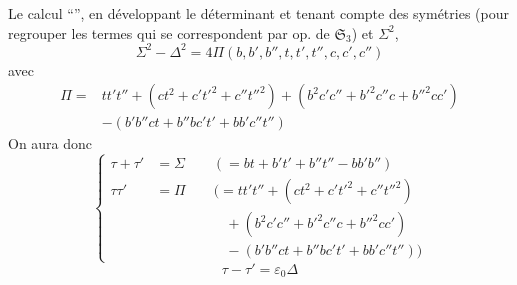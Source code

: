 Le calcul ``'', en développant le déterminant et tenant compte des symétries (pour regrouper les termes qui se correspondent par  op. de $\mathfrak{S}_3$) et $\Sigma^2$,
\[
\Sigma^2-\Delta^2=4\Pi(b,b',b'',t,t',t'',c,c',c'')
\]
avec
\[
\boxed{\begin{aligned}
\Pi={}&tt't''+(ct^2+c't'^2+c''t''^2)+(b^2c'c''+b'^2c''c+b''^2cc')\\
&-(b'b''ct+b''bc't'+bb'c''t'')
\end{aligned}}
\]
\inserted{\[
=tt't''+ct(t-b'b'')+c't'(t'-b''b)+c''t''(t''-bb')+(b^2c'c''+b'^2c''c+b''^2cc')
\]}
On aura donc
\[
\left\{\begin{aligned}
\tau+\tau'&=\Sigma\qquad(=bt+b't'+b''t''-bb'b'')\\
\tau\tau'&=\Pi\qquad\bigl(=tt't''+(ct^2+c't'^2+c''t''^2)\\
&\qquad\qquad\quad+(b^2c'c''+b'^2c''c+b''^2cc')\\
&\qquad\qquad\quad-(b'b''ct+b''bc't'+bb'c''t'')\bigr)
\end{aligned}\right.
\]
\[
\tau-\tau'=\varepsilon_0\Delta
\]
